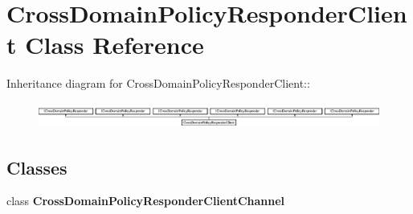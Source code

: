 \hypertarget{class_cross_domain_policy_responder_client}{
\section{CrossDomainPolicyResponderClient Class Reference}
\label{class_cross_domain_policy_responder_client}
}
Inheritance diagram for CrossDomainPolicyResponderClient::\begin{figure}[H]
\begin{center}
\leavevmode
\includegraphics[height=0.83707cm]{class_cross_domain_policy_responder_client}
\end{center}
\end{figure}
\subsection*{Classes}
\begin{DoxyCompactItemize}
\item 
class {\bfseries CrossDomainPolicyResponderClientChannel}
\end{DoxyCompactItemize}
